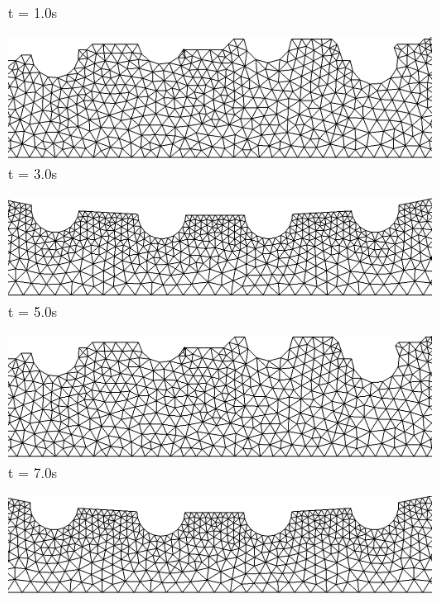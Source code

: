 \begin{figure}[H]
\begin{minipage}{.50\linewidth}
      t = 1.0s
     \end{minipage}%
     \begin{minipage}{.50\linewidth}
     \medskip
      \centering
      \includegraphics[scale=0.2]{./02_chaps/cap_solution/figure/alereal2.png}\\
      t = 3.0s
     \end{minipage}
     \begin{minipage}{.50\linewidth}
      \centering
      \includegraphics[scale=0.2]{./02_chaps/cap_solution/figure/alecurved3.png}\\
      t = 5.0s
     \end{minipage}%
     \begin{minipage}{.50\linewidth}
      \centering
      \includegraphics[scale=0.2]{./02_chaps/cap_solution/figure/alereal3.png}\\
      t = 7.0s
     \end{minipage}
     \begin{minipage}{.50\linewidth}
     \medskip
      \centering
      \includegraphics[scale=0.2]{./02_chaps/cap_solution/figure/alecurved4.png}\\

\end{minipage}
\end{figure}
